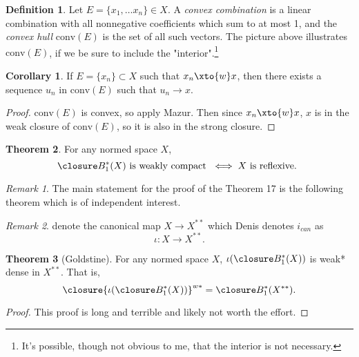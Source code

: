 \documentclass[a5paper]{article}
\theoremstyle{definition}%
\newtheorem{theorem}{Theorem}
\newtheorem{corollary}[theorem]{Corollary}
\newtheorem*{definition*}{Definition}
\numberwithin{exercise}{section}
\theoremstyle{remark}%
\newtheorem*{remark*}{Remark}
\begin{document}
\vfill
\pagebreak
\newcommand{\convexHull}[1]{\text{conv}\left(#1\right)}
\begin{definition*}
Let $E=\{x_1, \dots x_n\} \in X$. A \emph{convex combination} is a linear combination with all nonnegative coefficients which sum to at most 1, and the \emph{convex hull} $\convexHull{E}$ is the set of all such vectors. 
The picture above illustrates $\convexHull{E}$, if we be sure to include the "interior".\footnote{It's possible, though not obvious to me, that the interior is not necessary.} 
\end{definition*}
\begin{highlight}
\begin{corollary}
If $E=\{x_n\}\subset X$ such that $x_n\xto{w}x$, then there exists a sequence $u_n$ in $\convexHull{E}$ such that $u_n\to x$. 
\end{corollary}
\end{highlight}
\begin{proof}
$\convexHull{E}$ is convex, so apply Mazur. Then since $x_n\xto{w}x$, $x$ is in the weak closure of $\convexHull{E}$, so it is also in the strong closure. 
\end{proof}



\begin{highlight}
\begin{theorem}
For any normed space $X$, 
$$\B(X)\text{ is weakly compact } \iff X\text{ is reflexive. }$$
\end{theorem}
\end{highlight}

\begin{remark*}
The main statement for the proof of the Theorem 17
is the following theorem which is of independent interest.
\end{remark*}

\begin{remark*}
denote the canonical map $X\to X^{**}$ which Denis denotes $i_{can}$ as 
$$\iota:X\to X^{**}.$$
\end{remark*}

\begin{highlight}
\begin{theorem}[Goldstine]
For any normed space $X$, $\iota(\B(X))$ is weak* dense in $X^{**}$. That is, 
$$\closure{\iota(\B(X))}^{w*}=\B(X^{**}).$$
\end{theorem}
\end{highlight}
\begin{proof}
This proof is long and terrible and likely not worth the effort. 
\end{proof}
\end{document}
